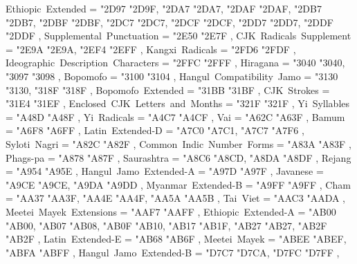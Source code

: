 {    Ethiopic~Extended                              = { {"2D97} {"2D9F}, {"2DA7} {"2DA7}, {"2DAF} {"2DAF}, {"2DB7} {"2DB7}, {"2DBF} {"2DBF}, {"2DC7} {"2DC7}, {"2DCF} {"2DCF}, {"2DD7} {"2DD7}, {"2DDF} {"2DDF} },
    Supplemental~Punctuation                       = { {"2E50} {"2E7F} },
    CJK~Radicals~Supplement                        = { {"2E9A} {"2E9A}, {"2EF4} {"2EFF} },
    Kangxi~Radicals                                = { {"2FD6} {"2FDF} },
    Ideographic~Description~Characters             = { {"2FFC} {"2FFF} },
    Hiragana                                       = { {"3040} {"3040}, {"3097} {"3098} },
    Bopomofo                                       = { {"3100} {"3104} },
    Hangul~Compatibility~Jamo                      = { {"3130} {"3130}, {"318F} {"318F} },
    Bopomofo~Extended                              = { {"31BB} {"31BF} },
    CJK~Strokes                                    = { {"31E4} {"31EF} },
    Enclosed~CJK~Letters~and~Months                = { {"321F} {"321F} },
    Yi~Syllables                                   = { {"A48D} {"A48F} },
    Yi~Radicals                                    = { {"A4C7} {"A4CF} },
    Vai                                            = { {"A62C} {"A63F} },
    Bamum                                          = { {"A6F8} {"A6FF} },
    Latin~Extended-D                               = { {"A7C0} {"A7C1}, {"A7C7} {"A7F6} },
    Syloti~Nagri                                   = { {"A82C} {"A82F} },
    Common~Indic~Number~Forms                      = { {"A83A} {"A83F} },
    Phags-pa                                       = { {"A878} {"A87F} },
    Saurashtra                                     = { {"A8C6} {"A8CD}, {"A8DA} {"A8DF} },
    Rejang                                         = { {"A954} {"A95E} },
    Hangul~Jamo~Extended-A                         = { {"A97D} {"A97F} },
    Javanese                                       = { {"A9CE} {"A9CE}, {"A9DA} {"A9DD} },
    Myanmar~Extended-B                             = { {"A9FF} {"A9FF} },
    Cham                                           = { {"AA37} {"AA3F}, {"AA4E} {"AA4F}, {"AA5A} {"AA5B} },
    Tai~Viet                                       = { {"AAC3} {"AADA} },
    Meetei~Mayek~Extensions                        = { {"AAF7} {"AAFF} },
    Ethiopic~Extended-A                            = { {"AB00} {"AB00}, {"AB07} {"AB08}, {"AB0F} {"AB10}, {"AB17} {"AB1F}, {"AB27} {"AB27}, {"AB2F} {"AB2F} },
    Latin~Extended-E                               = { {"AB68} {"AB6F} },
    Meetei~Mayek                                   = { {"ABEE} {"ABEF}, {"ABFA} {"ABFF} },
    Hangul~Jamo~Extended-B                         = { {"D7C7} {"D7CA}, {"D7FC} {"D7FF} },
}
